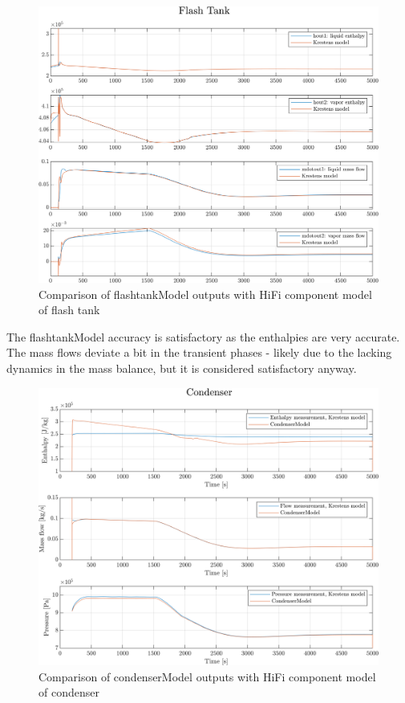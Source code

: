 \clearpage
\begin{figure}[h]
	\centering
	\includegraphics[width=1\textwidth]{Graphics/comp_test_ft.png}
	\caption{Comparison of flashtankModel outputs with HiFi component model of flash tank}
	\label{fig:component_test_ft}
\end{figure}
The flashtankModel accuracy is satisfactory as the enthalpies are very accurate. The mass flows deviate a bit in the transient phases - likely due to the lacking dynamics in the mass balance, but it is considered satisfactory anyway.


\clearpage
\begin{figure}[h]
	\centering
	\includegraphics[width=1\textwidth]{Graphics/comp_test_con.png}
	\caption{Comparison of condenserModel outputs with HiFi component model of condenser}
	\label{fig:component_test_con}
\end{figure}

